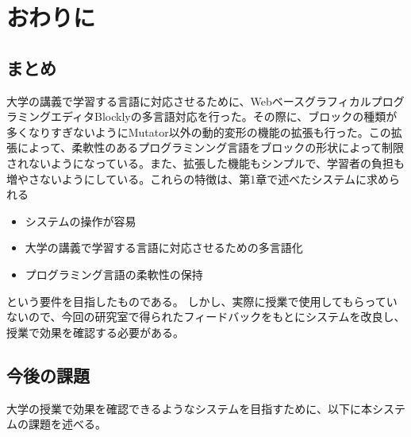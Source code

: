 \documentclass{eniepaper}
\begin{document}
   \chapter{おわりに}
   
   \section{まとめ}
   
大学の講義で学習する言語に対応させるために、WebベースグラフィカルプログラミングエディタBlocklyの多言語対応を行った。その際に、ブロックの種類が多くなりすぎないようにMutator以外の動的変形の機能の拡張も行った。この拡張によって、柔軟性のあるプログラミンング言語をブロックの形状によって制限されないようになっている。また、拡張した機能もシンプルで、学習者の負担も増やさないようにしている。これらの特徴は、第1章で述べたシステムに求められる

\begin{itemize}
\item システムの操作が容易
\item 大学の講義で学習する言語に対応させるための多言語化
\item プログラミング言語の柔軟性の保持
\end{itemize} 

という要件を目指したものである。
しかし、実際に授業で使用してもらっていないので、今回の研究室で得られたフィードバックをもとにシステムを改良し、授業で効果を確認する必要がある。
   
   \section{今後の課題}
   
大学の授業で効果を確認できるようなシステムを目指すために、以下に本システムの課題を述べる。
   
\end{document}
